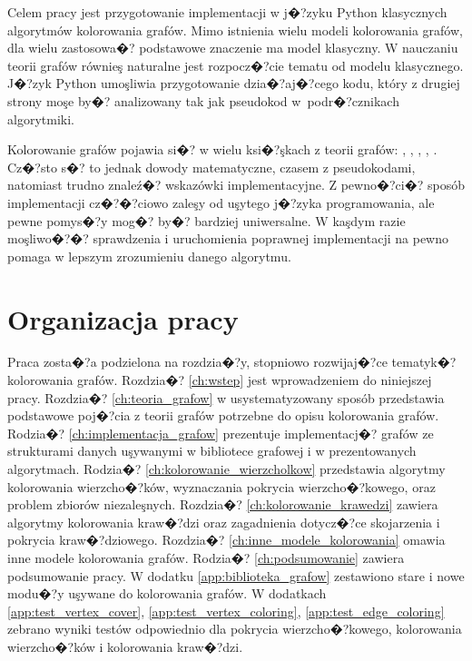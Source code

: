 \documentclass[12pt,a4paper]{mwrep}
\begin{document}
Celem pracy jest przygotowanie implementacji w j�?zyku Python
klasycznych algorytmów kolorowania grafów.
Mimo istnienia wielu modeli kolorowania grafów, dla wielu zastosowa�?
podstawowe znaczenie ma model klasyczny. W nauczaniu teorii
grafów równieş naturalne jest rozpocz�?cie tematu od modelu
klasycznego. J�?zyk Python umoşliwia przygotowanie dzia�?aj�?cego
kodu, który z drugiej strony moşe by�? analizowany tak jak
pseudokod w~podr�?cznikach algorytmiki.

Kolorowanie grafów pojawia si�? w wielu ksi�?şkach z teorii grafów:
\cite{Kubale},
\cite{Wojciechowski},
\cite{Wilson},
\cite{Deo},
\cite{CLRS}.
Cz�?sto s�? to jednak dowody matematyczne, czasem z pseudokodami,
natomiast trudno znaleź�? wskazówki implementacyjne.
Z pewno�?ci�? sposób implementacji cz�?�?ciowo zaleşy od uşytego
j�?zyka programowania, ale pewne pomys�?y mog�? by�? bardziej
uniwersalne. W kaşdym razie moşliwo�?�? sprawdzenia i uruchomienia
poprawnej implementacji na pewno pomaga w lepszym zrozumieniu
danego algorytmu.

\section{Organizacja pracy}

Praca zosta�?a podzielona na rozdzia�?y, stopniowo rozwijaj�?ce tematyk�? 
kolorowania grafów. 
Rozdzia�? \ref{ch:wstep}
jest wprowadzeniem do niniejszej pracy. 
Rozdzia�? \ref{ch:teoria_grafow}
w usystematyzowany sposób przedstawia podstawowe poj�?cia z teorii 
grafów potrzebne do opisu kolorowania grafów.
Rodzia�? \ref{ch:implementacja_grafow}
prezentuje implementacj�? grafów ze strukturami danych
uşywanymi w bibliotece grafowej i w prezentowanych algorytmach.
Rodzia�? \ref{ch:kolorowanie_wierzcholkow}
przedstawia algorytmy kolorowania wierzcho�?ków, wyznaczania
pokrycia wierzcho�?kowego, oraz problem zbiorów niezaleşnych. 
Rozdzia�? \ref{ch:kolorowanie_krawedzi}
zawiera algorytmy kolorowania kraw�?dzi oraz zagadnienia
dotycz�?ce skojarzenia i pokrycia kraw�?dziowego. 
Rozdzia�? \ref{ch:inne_modele_kolorowania}
omawia inne modele kolorowania grafów. 
Rodzia�? \ref{ch:podsumowanie} 
zawiera podsumowanie pracy.
W dodatku \ref{app:biblioteka_grafow} zestawiono stare i nowe
modu�?y uşywane do kolorowania grafów.
W dodatkach 
\ref{app:test_vertex_cover},
\ref{app:test_vertex_coloring},
\ref{app:test_edge_coloring}
zebrano wyniki testów odpowiednio dla pokrycia wierzcho�?kowego,
kolorowania wierzcho�?ków i kolorowania kraw�?dzi.

\end{document}
